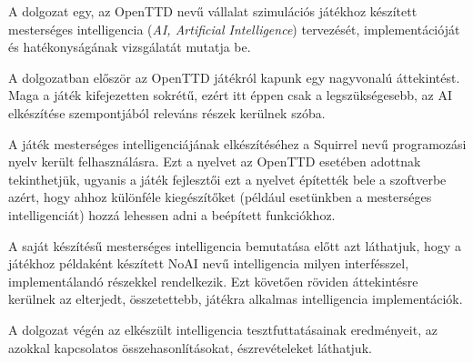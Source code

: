 
A dolgozat egy, az OpenTTD nevű vállalat szimulációs játékhoz készített mesterséges intelligencia (\textit{AI, Artificial Intelligence}) tervezését, implementációját és hatékonyságának vizsgálatát mutatja be.

A dolgozatban először az OpenTTD játékról kapunk egy nagyvonalú áttekintést. Maga a játék kifejezetten sokrétű, ezért itt éppen csak a legszükségesebb, az AI elkészítése szempontjából releváns részek kerülnek szóba.

A játék mesterséges intelligenciájának elkészítéséhez a Squirrel nevű programozási nyelv került felhasználásra. Ezt a nyelvet az OpenTTD esetében adottnak tekinthetjük, ugyanis a játék fejlesztői ezt a nyelvet építették bele a szoftverbe azért, hogy ahhoz különféle kiegészítőket (például esetünkben a mesterséges intelligenciát) hozzá lehessen adni a beépített funkciókhoz.

A saját készítésű mesterséges intelligencia bemutatása előtt azt láthatjuk, hogy a játékhoz példaként készített NoAI nevű intelligencia milyen interfésszel, implementálandó részekkel rendelkezik. Ezt követően röviden áttekintésre kerülnek az elterjedt, összetettebb, játékra alkalmas intelligencia implementációk.


A dolgozat végén az elkészült intelligencia tesztfuttatásainak eredményeit, az azokkal kapcsolatos összehasonlításokat, észrevételeket láthatjuk.
